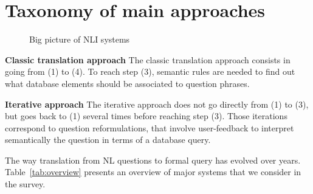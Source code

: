 \documentclass[10pt,journal,letterpaper,compsoc]{IEEEtran}
\begin{document}
\section{Taxonomy of main approaches}
\label{sec:overview}

\begin{figure}
\centering
{}
\caption{Big picture of NLI systems}
\label{fig:big-picture}
\end{figure}




\textbf{Classic translation approach}
The classic translation approach consists in going from (1) to (4).
To reach step (3), semantic rules are needed to find out what database elements
should be associated to question phrases. 

\textbf{Iterative approach}
The iterative approach does not go directly from (1) to (3), but goes back to
(1) several times before reaching step (3). 
Those iterations correspond to question reformulations, that involve
user-feedback to interpret semantically the question in terms of a database
query.


The way translation from NL questions to formal query has evolved over years.
Table~\ref{tab:overview} presents an overview of major systems that we consider
in the survey.
\end{document}
